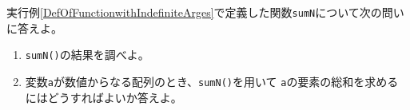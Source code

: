  \begin{Prob}\upshape
  実行例\ref{DefOfFunctionwithIndefiniteArges}で定義した関数\texttt{sumN}について次の問いに答えよ。
  \begin{enumerate}
   \item \texttt{sumN()}の結果を調べよ。
   \item 変数\texttt{a}が数値からなる配列のとき、\texttt{sumN()}を用いて
         \texttt{a}の要素の総和を求めるにはどうすればよいか答えよ。
  \end{enumerate}
\end{Prob}
